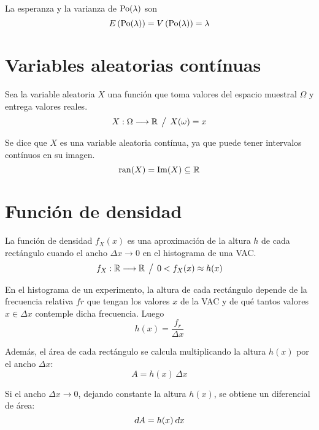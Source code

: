 \documentclass[a5paper,12pt,twoside]{book}
\begin{document}
La esperanza y la varianza de $\operatorname{Po}(\lambda)$ son
\begin{equation*}
    E \left(\operatorname{Po}(\lambda)\right) = V \left(\operatorname{Po}(\lambda)\right) = \lambda
\end{equation*}


\section{Variables aleatorias contínuas}

Sea la variable aleatoria $X$ una función que toma valores del espacio muestral $\Omega$ y entrega valores reales.
\begin{equation*}
    X: \Omega \longrightarrow \mathbb{R} \hspace{1ex} \big/ \hspace{1ex} X(\omega) = x
\end{equation*}

Se dice que $X$ es una variable aleatoria contínua, ya que puede tener intervalos contínuos en su imagen.
\begin{equation*}
    \operatorname{ran}(X) = \operatorname{Im}(X) \subseteq \mathbb{R}
\end{equation*}


\section{Función de densidad}

La función de densidad $f_X(x)$ es una aproximación de la altura $h$ de cada rectángulo cuando el ancho $\Delta x \to 0$ en el histograma de una VAC.
\begin{equation*}
    f_X: \mathbb{R} \longrightarrow \mathbb{R} \hspace{1ex} \big/ \hspace{1ex} 0 < f_X(x) \approx h(x)
\end{equation*}

En el histograma de un experimento, la altura de cada rectángulo depende de la frecuencia relativa $fr$ que tengan los valores $x$ de la VAC y de qué tantos valores $x \in \Delta x$ contemple dicha frecuencia. Luego
\begin{equation*}
    h(x) = \frac{f_r}{\Delta x}
\end{equation*}

Además, el área de cada rectángulo se calcula multiplicando la altura $h(x)$ por el ancho $\Delta x$:
\begin{equation*}
    A = h(x) \, \Delta x
\end{equation*}

Si el ancho $\Delta x \to 0$, dejando constante la altura $h(x)$, se obtiene un diferencial de área:
\begin{equation*}
    \textsl{d} A = h(x) \, \textsl{d} x
\end{equation*}
\end{document}
